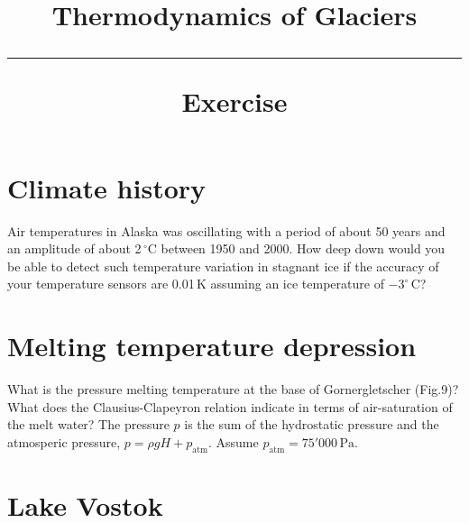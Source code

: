 \documentclass[10pt,DIV12,a4paper,halfparskip]{scrartcl}
\newcommand{\cels}[1]{\ensuremath{#1^{\circ}\,\mathrm{C}}}
\begin{document}
\vspace{-5em}

\title{Thermodynamics of Glaciers \\
\rule[1em]{\textwidth}{2pt}
\LARGE{\sf Exercise}
}
\date{}

\vspace{-5em}

\maketitle


\vspace{-5em}

\section{Climate history}

Air temperatures in Alaska was oscillating with a period of about 50 years and an amplitude of about 2$\,^\circ\text{C}$ between 1950 and 2000. How deep down would you be able to detect such temperature variation in stagnant ice if the accuracy of your temperature sensors are 0.01$\,\text{K}$ assuming an ice temperature of $-\cels{3}$?


\section{Melting temperature depression}

What is the pressure melting temperature at the base of Gornergletscher (Fig.9)? What does the Clausius-Clapeyron relation indicate in terms of air-saturation of the melt water? The pressure $p$ is the sum of the hydrostatic pressure and the atmosperic pressure, $p = \rho g H + p_{\text{atm}}$. Assume $p_{\text{atm}} = 75'000\,\text{Pa}$.

\section{Lake Vostok}
\end{document}
